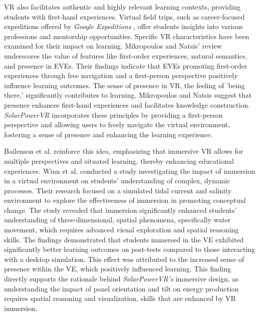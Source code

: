 \documentclass[draft, final]{vutinfth} %
\begin{document}
VR also facilitates authentic and highly relevant learning contexts, providing students with first-hand experiences. Virtual field trips, such as career-focused expeditions offered by \textit{Google Expeditions} \cite{Sung2015Effects}, offer students insights into various professions and mentorship opportunities. Specific VR characteristics have been examined for their impact on learning. Mikropoulos and Natsis' review \cite{Mikropoulos2011VrEducational} underscores the value of features like first-order experiences, natural semantics, and presence in EVEs. Their findings indicate that EVEs promoting first-order experiences through free navigation and a first-person perspective positively influence learning outcomes. The sense of presence in VR, the feeling of 'being there,' significantly contributes to learning. Mikropoulos and Natsis \cite{Mikropoulos2011VrEducational} suggest that presence enhances first-hand experiences and facilitates knowledge construction. \textit{SolarPowerVR} incorporates these principles by providing a first-person perspective and allowing users to freely navigate the virtual environment, fostering a sense of presence and enhancing the learning experience.

Bailenson et al. \cite{Bailenson2008Transformations} reinforce this idea, emphasizing that immersive VR allows for multiple perspectives and situated learning, thereby enhancing educational experiences. Winn et al. \cite{Winn2002Immersion} conducted a study investigating the impact of immersion in a virtual environment on students' understanding of complex, dynamic processes. Their research focused on a simulated tidal current and salinity environment to explore the effectiveness of immersion in promoting conceptual change. The study revealed that immersion significantly enhanced students' understanding of three-dimensional, spatial phenomena, specifically water movement, which requires advanced visual exploration and spatial reasoning skills. The findings demonstrated that students immersed in the VE exhibited significantly better learning outcomes on post-tests compared to those interacting with a desktop simulation. This effect was attributed to the increased sense of presence within the VE, which positively influenced learning. This finding directly supports the rationale behind \textit{SolarPowerVR's} immersive design, as understanding the impact of panel orientation and tilt on energy production requires spatial reasoning and visualization, skills that are enhanced by VR immersion.
\end{document}
